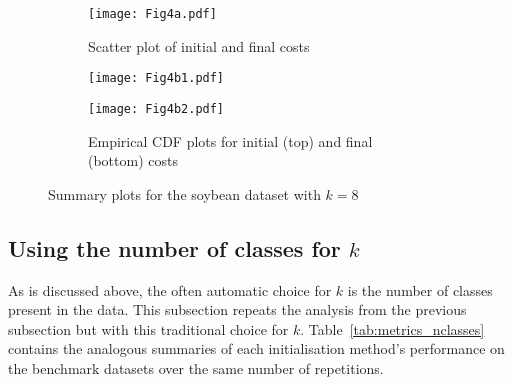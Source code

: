 \begin{figure}
    \begin{subfigure}{.5\textwidth}
        \texttt{[image: Fig4a.pdf]}
        \caption{Scatter plot of initial and final costs}
    \end{subfigure}
    \hfill%
    \begin{subfigure}{.5\textwidth}
        \texttt{[image: Fig4b1.pdf]}

        \texttt{[image: Fig4b2.pdf]}
        \caption{Empirical CDF plots for initial (top) and final (bottom) costs}
    \end{subfigure}
    \caption{Summary plots for the soybean dataset with \(k=8\)}%
    \label{fig:soybean_knee}
\end{figure}


\subsection{Using the number of classes for \(k\)}
\label{subsec:nclasses}

As is discussed above, the often automatic choice for \(k\) is the number of
classes present in the data. This subsection repeats the analysis from the
previous subsection but with this traditional choice for \(k\).
Table~\ref{tab:metrics_nclasses} contains the analogous summaries of each
initialisation method's performance on the benchmark datasets over the same
number of repetitions.

